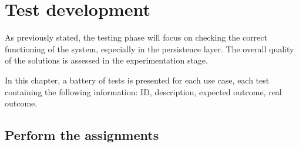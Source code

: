 \renewcommand{\documentname}{Test development}

\chapter{Test development}

As previously stated, the testing phase will focus on checking the correct functioning of the system, especially in the persistence layer. The overall quality of the solutions is assessed in the experimentation stage.

In this chapter, a battery of tests is presented for each use case, each test containing the following information: ID, description, expected outcome, real outcome.



\section{Perform the assignments}

